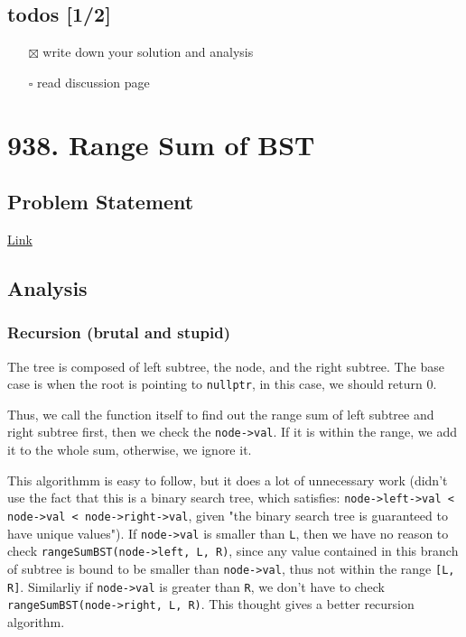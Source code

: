 \documentclass[12pt]{article}
\begin{document}
\subsection{todos [1/2]}
\label{sec:orgb9ec892}
\begin{itemize}
\item[{$\boxtimes$}] write down your solution and analysis
\item[{$\square$}] read discussion page
\end{itemize}
\section{938. Range Sum of BST}
\label{sec:org3157d8d}
\subsection{Problem Statement}
\label{sec:org036bf89}
\href{https://leetcode.com/problems/range-sum-of-bst/}{Link}
\subsection{Analysis}
\label{sec:org0fb0889}
\subsubsection{Recursion (brutal and stupid)}
\label{sec:org5f16598}
The tree is composed of left subtree, the node, and the right subtree. The base case is when the root is pointing to \texttt{nullptr}, in this case, we should return 0.

Thus, we call the function itself to find out the range sum of left subtree and right subtree first, then we check the \texttt{node->val}. If it is within the range, we add it to the whole sum, otherwise, we ignore it.

This algorithmm is easy to follow, but it does a lot of unnecessary work (didn't use the fact that this is a binary search tree, which satisfies: \texttt{node->left->val < node->val < node->right->val}, given "the binary search tree is guaranteed to have unique values"). If \texttt{node->val} is smaller than \texttt{L}, then we have no reason to check \texttt{rangeSumBST(node->left, L, R)}, since any value contained in this branch of subtree is bound to be smaller than \texttt{node->val}, thus not within the range \texttt{[L, R]}. Similarliy if \texttt{node->val} is greater than \texttt{R}, we don't have to check \texttt{rangeSumBST(node->right, L, R)}. This thought gives a better recursion algorithm.
\end{document}
